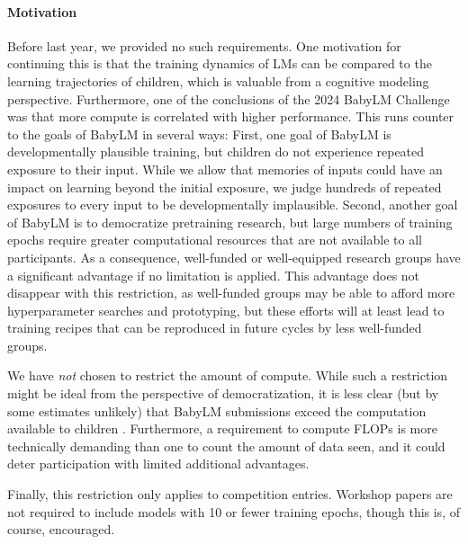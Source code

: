 \documentclass[11pt]{article}
\newcommand{\strict}[1]{\textsc{Strict}}
\newcommand{\strictsmall}[1]{\textsc{Strict-small}}
\newcommand{\paper}[1]{\textsc{Paper}}
\newcommand{\vision}[1]{\textsc{Multimodal}}
\begin{document}
\paragraph{Motivation}
Before last year, we provided no such requirements.
One motivation for continuing this is that the training dynamics of LMs can be compared to the learning trajectories of children, which is valuable from a cognitive modeling perspective.
Furthermore, one of the conclusions of the 2024 BabyLM Challenge was that more compute is correlated with higher performance.
This runs counter to the goals of BabyLM in several ways:
First, one goal of BabyLM is developmentally plausible training, but children do not experience repeated exposure to their input.
While we allow that memories of inputs could have an impact on learning beyond the initial exposure, we judge hundreds of repeated exposures to every input to be developmentally implausible.
Second, another goal of BabyLM is to democratize pretraining research, but large numbers of training epochs require greater computational resources that are not available to all participants.
As a consequence, well-funded or well-equipped research groups have a significant advantage if no limitation is applied.
This advantage does not disappear with this restriction, as well-funded groups may be able to afford more hyperparameter searches and prototyping, but these efforts will at least lead to training recipes that can be reproduced in future cycles by less well-funded groups.

We have \emph{not} chosen to restrict the amount of compute.
While such a restriction might be ideal from the perspective of democratization, it is less clear (but by some estimates unlikely) that BabyLM submissions exceed the computation available to children \citep{sandberg2008whole}.
Furthermore, a requirement to compute FLOPs is more technically demanding than one to count the amount of data seen, and it could deter participation with limited additional advantages.

Finally, this restriction only applies to competition entries.
Workshop papers are not required to include models with 10 or fewer training epochs, though this is, of course, encouraged.




\end{document}
